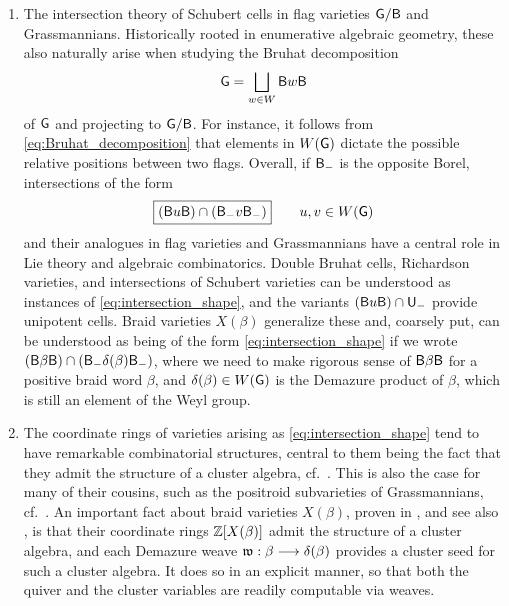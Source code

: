 \begin{enumerate}
    \item The intersection theory of Schubert cells in flag varieties $\mathsf{G}/\mathsf{B}$ and Grassmannians. Historically rooted in enumerative algebraic geometry, these also naturally arise when studying the Bruhat decomposition
        \begin{equation}\label{eq:Bruhat_decomposition}\mathsf{G}=\bigsqcup_{w\in W}\mathsf{B} w\mathsf{B}
        \end{equation}
    of $\mathsf{G}$ and projecting to $\mathsf{G}/\mathsf{B}$. For instance, it follows from \eqref{eq:Bruhat_decomposition} that elements in $W(\mathsf{G})$ dictate the possible relative positions between two flags. Overall, if $\mathsf{B}_-$ is the opposite Borel, intersections of the form
        \begin{equation}\label{eq:intersection_shape}
            \fbox{$(\mathsf{B} u\mathsf{B})\cap(\mathsf{B}_- v\mathsf{B}_-)$}\qquad u,v\in W(\mathsf{G})
        \end{equation}
and their analogues in flag varieties and Grassmannians have a central role in Lie theory and algebraic combinatorics. Double Bruhat cells, Richardson varieties, and intersections of Schubert varieties can be understood as instances of \eqref{eq:intersection_shape}, and the variants $(\mathsf{B} u\mathsf{B})\cap\mathsf{U}_-$ provide unipotent cells. Braid varieties $X(\beta)$ generalize these and, coarsely put, can be understood as being of the form \eqref{eq:intersection_shape} if we wrote $(\mathsf{B}\beta\mathsf{B})\cap(\mathsf{B}_-\delta(\beta)\mathsf{B}_-)$, where we need to make rigorous sense of $\mathsf{B}\beta\mathsf{B}$ for a positive braid word $\beta$, and $\delta(\beta)\in W(\mathsf{G})$ is the Demazure product of $\beta$, which is still an element of the Weyl group.\\

\item The coordinate rings of varieties arising as \eqref{eq:intersection_shape} tend to have remarkable combinatorial structures, central to them being the fact that they admit the structure of a cluster algebra, cf.~\cite{FWZ16,FZ2002I,FZ2003II,BFZ2005,FZ2007IV,BZ2005}. This is also the case for many of their cousins, such as the positroid subvarieties of Grassmannians, cf.~\cite{GL2023,Scott06,SSBW2019,FSB2022,JKS2016,BKM2016}. An important fact about braid varieties $X(\beta)$, proven in \cite{CGGLSS25}, and see also \cite{GalashinLamShermanBennettSpeyer2022TypeA,GalashinLamShermanBennett2026GeneralType,casals2025comparingclusteralgebrasbraid}, is that their coordinate rings $\mathbb{Z}[X(\beta)]$ admit the structure of a cluster algebra, and each Demazure weave $\mathfrak{w}:\beta\longrightarrow\delta(\beta)$ provides a cluster seed for such a cluster algebra. It does so in an explicit manner, so that both the quiver and the cluster variables are readily computable via weaves.\\


\end{enumerate}
